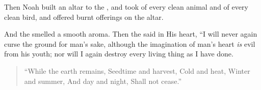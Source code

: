 
\bverse Then Noah built an altar to the \lord, and took of every clean animal and of every clean bird, and offered burnt offerings on the altar.

\bverse And the \lord smelled a smooth aroma. Then the \lord said in His heart, ``I will never again curse the ground for man's sake, although the imagination of man's heart \textit{is} evil from his youth; nor will I again destroy every living thing as I have done.

\begin{quotation}
\bverse ``While the earth remains, Seedtime and harvest, Cold and heat, Winter and summer, And day and night, Shall not cease.''
\end{quotation}
